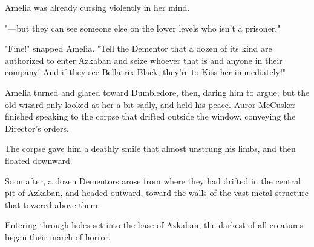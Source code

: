 Amelia was already cursing violently in her mind.

"---but they can see someone else on the lower levels who isn't a prisoner."

"Fine!" snapped Amelia. "Tell the Dementor that a dozen of its kind are
authorized to enter Azkaban and seize whoever that is and anyone in their
company! And if they see Bellatrix Black, they're to Kiss her immediately!"

Amelia turned and glared toward Dumbledore, then, daring him to argue; but the
old wizard only looked at her a bit sadly, and held his peace.
\sbreak
Auror McCusker finished speaking to the corpse that drifted outside the window,
conveying the Director's orders.

The corpse gave him a deathly smile that almost unstrung his limbs, and then
floated downward.

Soon after, a dozen Dementors arose from where they had drifted in the central
pit of Azkaban, and headed outward, toward the walls of the vast metal
structure that towered above them.

Entering through holes set into the base of Azkaban, the darkest of all
creatures began their march of horror.
